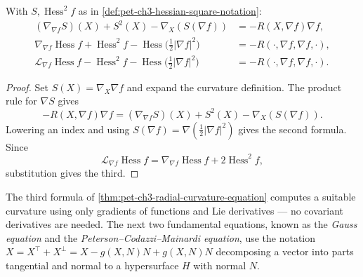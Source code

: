 \begin{theorem}
  \label{thm:pet-ch3-radial-curvature-equation}


  With $S,\operatorname{Hess}^2f$ as in \cref{def:pet-ch3-hessian-square-notation}:
  \begin{align}
    (\nabla_{\nabla f}S)(X)+S^2(X)-\nabla_X(S(\nabla f))&=-R(X,\nabla f)\nabla f,\\
    \nabla_{\nabla f}\operatorname{Hess}f+\operatorname{Hess}^2f-\operatorname{Hess}\Big(\tfrac12|\nabla
    f|^2\Big)&=-R(\cdot,\nabla f,\nabla f,\cdot),\\
    \mathcal L_{\nabla f}\operatorname{Hess}f-\operatorname{Hess}^2f-\operatorname{Hess}\Big(\tfrac12|\nabla
    f|^2\Big)&=-R(\cdot,\nabla f,\nabla f,\cdot).
  \end{align}
\end{theorem}
\begin{proof}

  \sketch
  Set $S(X)=\nabla_X\nabla f$ and expand the curvature definition. The product
  rule for $\nabla S$ gives
  \[
   -R(X,\nabla f)\nabla f
   =(\nabla_{\nabla f}S)(X)+S^2(X)-\nabla_X(S(\nabla f)).
  \]
  Lowering an index and using
  $S(\nabla f)=\nabla(\tfrac12|\nabla f|^2)$ gives the second formula. Since
  \[
   \mathcal L_{\nabla f}\operatorname{Hess}f
   =\nabla_{\nabla f}\operatorname{Hess}f+2\operatorname{Hess}^2f,
  \]
  substitution gives the third.
\end{proof}

\begin{remark}
  \label{rem:pet-ch3-tangential-normal-decomposition}


  The third formula of \cref{thm:pet-ch3-radial-curvature-equation} computes a
  suitable curvature using only gradients of functions and Lie derivatives — no
  covariant derivatives are needed. The next two fundamental equations, known as
  the \emph{Gauss equation} and the \emph{Peterson--Codazzi--Mainardi equation},
  use the notation
  $X=X^\top+X^\perp=X-g(X,N)N+g(X,N)N$
  decomposing a vector into parts tangential and normal to a hypersurface $H$
  with normal $N$.
\end{remark}

